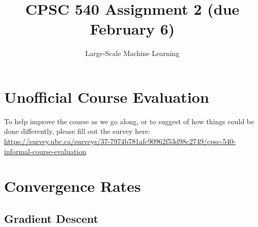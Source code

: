 \documentclass{article}
\begin{document}
\def\blu#1{{\color{blu}#1}}
\def\gre#1{{\color{gre}#1}}
\def\red#1{{\color{red}#1}}
\def\norm#1{\|#1\|}
\newcommand{\argmin}[1]{\mathop{\hbox{argmin}}_{#1}}
\newcommand{\argmax}[1]{\mathop{\hbox{argmax}}_{#1}}
\def\R{\mathbb{R}}
\newcommand{\fig}[2]{\texttt{[image: a2f/\#2]}}
\newcommand{\centerfig}[2]{\begin{center}\texttt{[image: a2f/\#2]}\end{center}}
\def\items#1{\begin{itemize}#1\end{itemize}}
\def\enum#1{\begin{enumerate}#1\end{enumerate}}
\def\argmax{\mathop{\rm arg\,max}}
\def\argmin{\mathop{\rm arg\,min}}
\def\half{\frac 1 2}
\newcommand{\code}[1]{}
\newcommand{\alignStar}[1]{\begin{align*}#1\end{align*}}


\title{CPSC 540 Assignment 2 (due February 6)}
\author{Large-Scale Machine Learning}
\date{}
\maketitle

\setcounter{section}{-1}
\section{Unofficial Course Evaluation}

To help improve the course as we go along, or to suggest of how things could be done differently, please fill out the survey here:\\
\url{https://survey.ubc.ca/surveys/37-7974b781afc90962f53d98c2749/cpsc-540-informal-course-evaluation}

\section{Convergence Rates}

\subsection{Gradient Descent}
\end{document}
